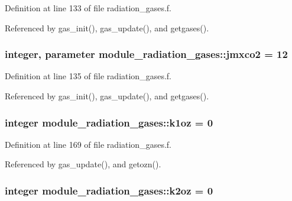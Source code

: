 Definition at line 133 of file radiation\+\_\+gases.\+f.



Referenced by gas\+\_\+init(), gas\+\_\+update(), and getgases().

\subsubsection[{\texorpdfstring{jmxco2}{jmxco2}}]{\setlength{\rightskip}{0pt plus 5cm}integer, parameter module\+\_\+radiation\+\_\+gases\+::jmxco2 = 12\hspace{0.3cm}{\ttfamily [private]}}\hypertarget{namespacemodule__radiation__gases_aa56e209872093bfcbdaeb452f5e5e332}{}\label{namespacemodule__radiation__gases_aa56e209872093bfcbdaeb452f5e5e332}


Definition at line 135 of file radiation\+\_\+gases.\+f.



Referenced by gas\+\_\+init(), gas\+\_\+update(), and getgases().

\subsubsection[{\texorpdfstring{k1oz}{k1oz}}]{\setlength{\rightskip}{0pt plus 5cm}integer module\+\_\+radiation\+\_\+gases\+::k1oz = 0\hspace{0.3cm}{\ttfamily [private]}}\hypertarget{namespacemodule__radiation__gases_a0a14666484f230d3506a9b4740e2eeda}{}\label{namespacemodule__radiation__gases_a0a14666484f230d3506a9b4740e2eeda}


Definition at line 169 of file radiation\+\_\+gases.\+f.



Referenced by gas\+\_\+update(), and getozn().

\subsubsection[{\texorpdfstring{k2oz}{k2oz}}]{\setlength{\rightskip}{0pt plus 5cm}integer module\+\_\+radiation\+\_\+gases\+::k2oz = 0\hspace{0.3cm}{\ttfamily [private]}}\hypertarget{namespacemodule__radiation__gases_a0c3727c9e2a0bec46e84622c4591cd8b}{}\label{namespacemodule__radiation__gases_a0c3727c9e2a0bec46e84622c4591cd8b}


